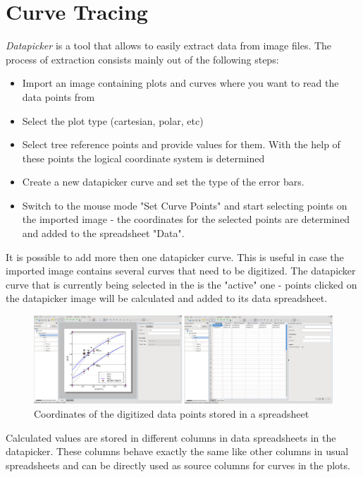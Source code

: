 \section{Curve Tracing}\label{sec:curve_tracing}
\textit{Datapicker} is a tool that allows to easily extract data from image files. The process of extraction consists mainly out of the following steps:
\begin{itemize}
\item Import an image containing plots and curves where you want to read the data points from
\item Select the plot type (cartesian, polar, etc) 
\item Select tree reference points and provide values for them. With the help of these points the logical coordinate system is determined
\item Create a new datapicker curve and set the type of the error bars.
\item Switch to the mouse mode "Set Curve Points" and start selecting points on the imported image - the coordinates for the selected points are determined and added to the spreadsheet "Data".
\end{itemize}

It is possible to add more then one datapicker curve. This is useful in case the imported image contains several curves that need to be digitized.
The datapicker curve that is currently being selected in the  is the "active" one - points clicked on the datapicker image will be calculated and added to its data spreadsheet.
\begin{figure}
\includegraphics[width=\textwidth]{images/datapicker_active_curve_data_spreadsheet.png}
\caption{Coordinates of the digitized data points stored in a spreadsheet}
\end{figure}

Calculated values are stored in different columns in data spreadsheets in the datapicker. These columns behave exactly the same like other columns
in usual spreadsheets and can be directly used as source columns for curves in the plots.

